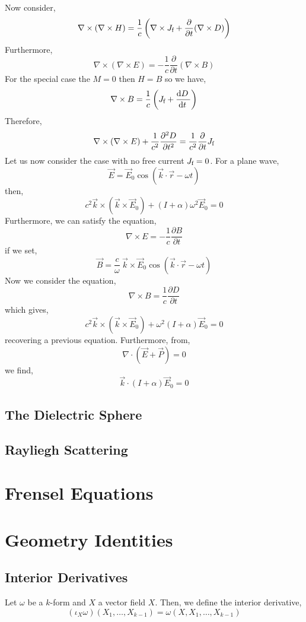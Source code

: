 \documentclass[12pt]{extarticle}
\renewcommand{\d}[1]{ \mathrm{d}#1 \:}
\newcommand{\deriv}[2]{\frac{\d{#1}}{\d{#2}}}
\newcommand{\pderiv}[2]{\frac{\partial{#1}}{\partial{#2}}}
\newcommand{\npar}[3]{\frac{\partial^{#1}{#2}}{\partial{#3}^{#1}}}
\theoremstyle{definition}
\newenvironment{definition}[1][Definition:]{\begin{trivlist}
\item[\hskip \labelsep {\bfseries #1}]}{\end{trivlist}}
\begin{document}
Now consider,
\[ \nabla \times (\nabla \times H) = \frac{1}{c} \left( \nabla \times J_{\free} +  \pderiv{}{t} (\nabla \times D ) \right) \]
Furthermore,
\[ \nabla \times (\nabla \times E) = - \frac{1}{c} \pderiv{}{t} ( \nabla \times B) \]
For the special case the $M = 0$ then $H = B$ so we have,
\[ \nabla \times B = \frac{1}{c} \left( J_{\free} + \deriv{D}{t} \right) \]
Therefore,
\[ \nabla \times (\nabla \times E) + \frac{1}{c^2} \npar{2}{D}{t} = \frac{1}{c^2} \pderiv{}{t} J_{\free} \] 
Let us now consider the case with no free current $J_{\text{f}} = 0$.
For a plane wave, 
\[ \vec{E} = \vec{E}_0 \cos{(\vec{k} \cdot \vec{r} - \omega t)} \]
then,
\[ c^2 \vec{k} \times (\vec{k} \times \vec{E}_0) + (I + \alpha) \omega^2 \vec{E}_0 = 0 \]
Furthermore, we can satisfy the equation,
\[ \nabla \times E = - \frac{1}{c} \pderiv{B}{t} \]
if we set,
\[ \vec{B} = \frac{c}{\omega} \: \vec{k} \times \vec{E}_0 \cos{(\vec{k} \cdot \vec{r} - \omega t)} \]
Now we consider the equation,
\[ \nabla \times B = \frac{1}{c} \pderiv{D}{t} \]
which gives,
\[  c^2 \vec{k} \times (\vec{k} \times \vec{E}_0) + \omega^2 (I + \alpha) \vec{E}_0 = 0 \]
recovering a previous equation. Furthermore, from,
\[ \nabla \cdot (\vec{E} + \vec{P}) = 0 \]
we find,
\[ \vec{k} \cdot (I + \alpha) \vec{E}_0 = 0 \]

\subsection{The Dielectric Sphere}

\subsection{Rayliegh Scattering}

\section{Frensel Equations}

\section{Geometry Identities}
\renewcommand{\L}{\mathcal{L}}

\subsection{Interior Derivatives}


\begin{definition}
Let $\omega$ be a $k$-form and $X$ a vector field $X$. Then, we define the interior derivative,
\[ (\iota_X \omega)(X_1, \dots, X_{k-1}) = \omega(X, X_1, \dots, X_{k-1}) \] 
\end{definition}
\end{document}
